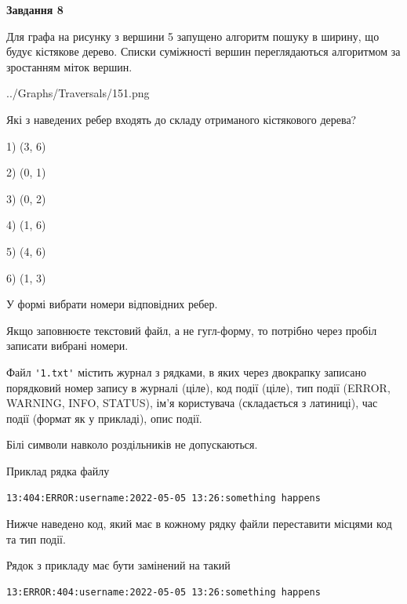 \documentclass[12pt, ukrainian]{article}
\def\code#1{\Verb!#1!}
\begin{document}
{\begin {large}
{\begin {center}\textbf{Завдання 8}\end {center}}\par
Для графа на рисунку з вершини 5 запущено алгоритм пошуку в ширину, що будує кістякове дерево. Списки суміжності вершин переглядаються алгоритмом за зростанням міток вершин.\par
\begin{center}
	{../Graphs/Traversals/151.png}
\end{center}
\par Які з наведених ребер входять до складу отриманого кістякового дерева?\par
1) (3, 6)\par
2) (0, 1)\par
3) (0, 2)\par
4) (1, 6)\par
5) (4, 6)\par
6) (1, 3)\par
{\vskip 15pt} У формі вибрати номери відповідних ребер.


Якщо заповнюєте текстовий файл, а не гугл-форму, то потрібно через пробіл записа\-ти вибрані номери.\par
\newpage


Файл \code{'1.txt'} містить журнал з рядками, в яких через двокрапку записано поряд\-ко\-вий номер запису в журналі (ціле), код події (ціле), тип події (ERROR,\\ WARNING, INFO, STATUS), ім'я користувача (складається з латиниці), час події (фор\-мат як у прикладі), опис події.

Білі символи навколо роздільників не допускаються.

Приклад рядка файлу



\begin{verbatim}
13:404:ERROR:username:2022-05-05 13:26:something happens
\end{verbatim}


Нижче наведено код, який має в кожному рядку файли переставити місцями код та тип події.

Рядок з прикладу має бути замінений на такий



\begin{verbatim}
13:ERROR:404:username:2022-05-05 13:26:something happens
\end{verbatim}





\end{large}}
\end{document}
